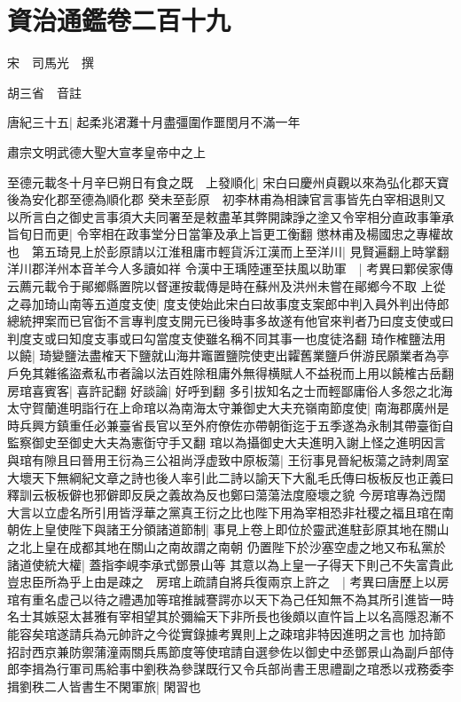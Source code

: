 \chapter{資治通鑑卷二百十九}
宋　司馬光　撰

胡三省　音註

唐紀三十五|{
	起柔兆涒灘十月盡彊圍作噩閏月不滿一年}


肅宗文明武德大聖大宣孝皇帝中之上

至德元載冬十月辛巳朔日有食之既　上發順化|{
	宋白曰慶州貞觀以來為弘化郡天寶後為安化郡至德為順化郡}
癸未至彭原　初李林甫為相諫官言事皆先白宰相退則又以所言白之御史言事須大夫同署至是敕盡革其弊開諫諍之塗又令宰相分直政事筆承旨旬日而更|{
	令宰相在政事堂分日當筆及承上旨更工衡翻}
懲林甫及楊國忠之專權故也　第五琦見上於彭原請以江淮租庸市輕貨泝江漢而上至洋川|{
	見賢遍翻上時掌翻洋川郡洋州本音羊今人多讀如祥}
令漢中王瑀陸運至扶風以助軍　|{
	考異曰鄴侯家傳云薦元載令于鄖鄉縣置院以督運按載傳是時在蘇州及洪州未嘗在鄖鄉今不取}
上從之尋加琦山南等五道度支使|{
	度支使始此宋白曰故事度支案郎中判入員外判出侍郎總統押案而已官衘不言專判度支開元已後時事多故遂有他官來判者乃曰度支使或曰判度支或曰知度支事或曰勾當度支使雖名稱不同其事一也度徒洛翻}
琦作榷鹽法用以饒|{
	琦變鹽法盡榷天下鹽就山海井竈置鹽院使吏出糶舊業鹽戶併游民願業者為亭戶免其雜徭盜煮私市者論以法百姓除租庸外無得横賦人不益税而上用以饒榷古岳翻}
房琯喜賓客|{
	喜許記翻}
好談論|{
	好呼到翻}
多引拔知名之士而輕鄙庸俗人多怨之北海太守賀蘭進明詣行在上命琯以為南海太守兼御史大夫充嶺南節度使|{
	南海郡廣州是時兵興方鎮重任必兼臺省長官以至外府僚佐亦帶朝衘迄于五季遂為永制其帶臺衘自監察御史至御史大夫為憲衘守手又翻}
琯以為攝御史大夫進明入謝上怪之進明因言與琯有隙且曰晉用王衍為三公祖尚浮虚致中原板蕩|{
	王衍事見晉紀板蕩之詩刺周室大壞天下無綱紀文章之詩也後人率引此二詩以諭天下大亂毛氏傳曰板板反也正義曰釋訓云板板僻也邪僻即反戾之義故為反也鄭曰蕩蕩法度廢壞之貌}
今房琯專為迃闊大言以立虚名所引用皆浮華之黨真王衍之比也陛下用為宰相恐非社稷之福且琯在南朝佐上皇使陛下與諸王分領諸道節制|{
	事見上卷上即位於靈武進駐彭原其地在關山之北上皇在成都其地在關山之南故謂之南朝}
仍置陛下於沙塞空虚之地又布私黨於諸道使統大權|{
	蓋指李峴李承式鄧景山等}
其意以為上皇一子得天下則己不失富貴此豈忠臣所為乎上由是疎之　房琯上疏請自將兵復兩京上許之　|{
	考異曰唐歷上以房琯有重名虚己以待之禮遇加等琯推誠謇諤亦以天下為己任知無不為其所引進皆一時名士其嫉惡太甚雅有宰相望其於彌綸天下非所長也後頗以直忤旨上以名高隱忍漸不能容矣琯遂請兵為元帥許之今從實錄據考異則上之疎琯非特因進明之言也}
加持節招討西京兼防禦蒲潼兩關兵馬節度等使琯請自選參佐以御史中丞鄧景山為副戶部侍郎李揖為行軍司馬給事中劉秩為參謀既行又令兵部尚書王思禮副之琯悉以戎務委李揖劉秩二人皆書生不閑軍旅|{
	閑習也}
